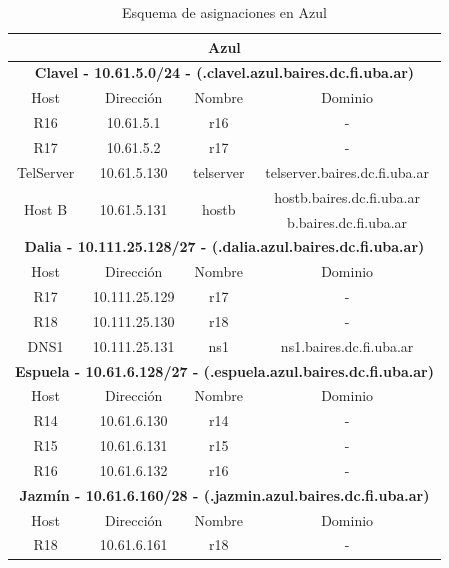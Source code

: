 \begin{table}[!htbp]
	\centering
	\begin{tabular}{|c|c|c|c|}   
		\hline
		\multicolumn{4}{|c|}{\textbf{Azul}} \\
		\hline
		\hline
		\multicolumn{4}{|c|}{\textbf{Clavel - 10.61.5.0/24 - (.clavel.azul.baires.dc.fi.uba.ar)}} \\
		\hline
		Host & Dirección & Nombre & Dominio \\
		\hline
		R16 & 10.61.5.1 & r16 & - \\
		\hline 
		R17 & 10.61.5.2 & r17 & - \\
		\hline
		TelServer & 10.61.5.130 & telserver & telserver.baires.dc.fi.uba.ar \\
 		\hline
		\multirow{2}{*}{Host B} & \multirow{2}{*}{10.61.5.131} & \multirow{2}{*}{hostb} & hostb.baires.dc.fi.uba.ar \\
			& & & b.baires.dc.fi.uba.ar \\
		\hline
		\hline
		\multicolumn{4}{|c|}{\textbf{Dalia - 10.111.25.128/27 - (.dalia.azul.baires.dc.fi.uba.ar)}} \\
		\hline
		Host & Dirección & Nombre & Dominio \\
		\hline
		R17 & 10.111.25.129 & r17 & - \\
		\hline
		R18 & 10.111.25.130 & r18 & - \\
		\hline
		DNS1 & 10.111.25.131 & ns1 & ns1.baires.dc.fi.uba.ar \\
		\hline
		\hline
		\multicolumn{4}{|c|}{\textbf{Espuela - 10.61.6.128/27 - (.espuela.azul.baires.dc.fi.uba.ar)}} \\
		\hline
		Host & Dirección & Nombre & Dominio \\
		\hline
		R14 & 10.61.6.130 & r14 & - \\
		\hline
		R15 & 10.61.6.131 & r15 & - \\
		\hline
		R16 & 10.61.6.132 & r16 & - \\
		\hline
		\hline
		\multicolumn{4}{|c|}{\textbf{Jazmín - 10.61.6.160/28 - (.jazmin.azul.baires.dc.fi.uba.ar)}} \\
		\hline
		Host & Dirección & Nombre & Dominio \\
		\hline
		R18 & 10.61.6.161 & r18 & - \\
		\hline
 	\end{tabular}
	\caption{Esquema de asignaciones en Azul}
\end{table}

